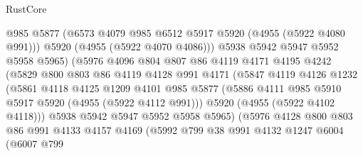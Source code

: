 \begin{lexlean}{RustCore}
\begin{coremodule}
                              @985
                              @5877
                              (@6573 @4079 @985 @6512 @5917 @5920 (@4955 (@5922 @4080 @991)))
                              @5920
                              (@4955 (@5922 @4070 @4086)))
                            @5938
                            @5942
                            @5947
                            @5952
                            @5958
                            @5965)
                          (@5976
                            @4096
                            @804
                            @807
                            @86
                            @4119
                            @4171
                            @4195
                            @4242
                            (@5829
                              @800
                              @803
                              @86
                              @4119
                              @4128
                              @991
                              @4171
                              (@5847
                                @4119
                                @4126
                                @1232
                                (@5861
                                  @4118
                                  @4125
                                  @1209
                                  @4101
                                  @985
                                  @5877
                                  (@5886 @4111 @985 @5910 @5917 @5920 (@4955 (@5922 @4112 @991)))
                                  @5920
                                  (@4955 (@5922 @4102 @4118)))
                                @5938
                                @5942
                                @5947
                                @5952
                                @5958
                                @5965)
                              (@5976
                                @4128
                                @800
                                @803
                                @86
                                @991
                                @4133
                                @4157
                                @4169
                                (@5992
                                  @799
                                  @38
                                  @991
                                  @4132
                                  @1247
                                  @6004
                                  (@6007
                                    @799

\end{coremodule}
\end{lexlean}
